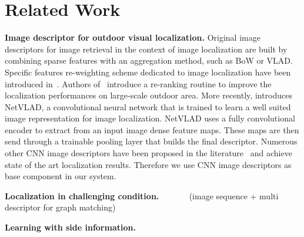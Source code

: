 \section{Related Work}
\label{sec:related_work}

\vspace{4pt}\noindent\textbf{Image descriptor for outdoor visual localization.} Original image descriptors for image retrieval in the context of image localization are built by combining sparse features with an aggregation method, such as BoW or VLAD. Specific features re-weighting scheme dedicated to image localization have been introduced in~\cite{Arandjelovic2014}. Authors of~\cite{Sattler2016} introduce a re-ranking routine to improve the localization performances on large-scale outdoor area. More recently, \cite{Arandjelovic2017} introduces NetVLAD, a convolutional neural network that is trained to learn a well suited image representation for image localization. NetVLAD uses a fully convolutional encoder to extract from an input image dense feature maps. These maps are then send through a trainable pooling layer that builds the final descriptor. Numerous other CNN image descriptors have been proposed in the literature~\cite{Kim2017a,Gordo2017,Radenovic2017,Sunderhauf2015a,Liu2018} and achieve state of the art localization results. Therefore we use CNN image descriptors as base component in our system.

\vspace{4pt}\noindent\textbf{Localization in challenging condition.} ~\cite{Sattler2018} ~\cite{Torii2015} ~\cite{Porav2018} ~\cite{Naseer2018} (image sequence + multi descriptor for graph matching) ~\cite{Schonberger2018} ~\cite{Garg2018} ~\cite{Naseer2017a}

\vspace{4pt}\noindent\textbf{Learning with side information.} 
